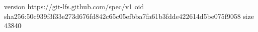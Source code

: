 version https://git-lfs.github.com/spec/v1
oid sha256:50c939f3f33e273d676fd842c65c05efbba7fa61b3fdde422614d5be075f9058
size 43840
